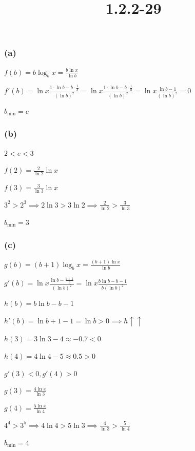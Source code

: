 \documentclass{article}
\title{1.2.2-29}
\begin{document}
\maketitle

\subsubsection*{(a)}

$f(b) = b \log_b{x} = \frac{b\ln{x}}{\ln{b}}$

$f'(b) = \ln{x} \frac{1 \cdot \ln{b} - b \cdot \frac{1}{b}}{(\ln{b})^2} = \ln{x} \frac{1 \cdot \ln{b} - b \cdot \frac{1}{b}}{(\ln{b})^2} = \ln{x} \frac{\ln{b} - 1}{(\ln{b})^2} = 0$

$b_{\min} = e$

\subsubsection*{(b)}

$2 < e < 3$

$f(2) = \frac{2}{\ln{2}}\ln{x}$

$f(3) = \frac{3}{\ln{3}}\ln{x}$

$3^2 > 2^3 \implies 2\ln{3} > 3\ln{2} \implies \frac{2}{\ln{2}} > \frac{3}{\ln{3}}$

$b_{\min} = 3$

\subsubsection*{(c)}

$g(b) = (b+1)\log_b{x} = \frac{(b+1)\ln{x}}{\ln{b}}$

$g'(b)=\ln{x}\frac{\ln{b} - \frac{b+1}{b}}{(\ln{b})^2} = \ln{x}\frac{b\ln{b} - b - 1}{b(\ln{b})^2}$

$h(b) = b\ln{b} - b - 1$

$h'(b) = \ln{b} + 1 - 1 = \ln{b} > 0 \implies h \uparrow \uparrow$

$h(3) = 3\ln{3} - 4 \approx -0.7 < 0$

$h(4) = 4\ln{4} - 5 \approx 0.5 > 0$

$g'(3) < 0, g'(4) > 0$

$g(3) = \frac{4\ln{x}}{\ln{3}}$

$g(4) = \frac{5\ln{x}}{\ln{4}}$

$4^4 > 3^5 \implies 4 \ln{4} > 5 \ln{3} \implies \frac{4}{\ln{3}} > \frac{5}{\ln{4}}$

$b_{\min} = 4$
\end{document}
